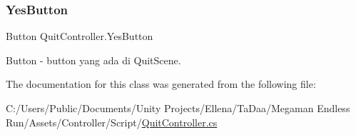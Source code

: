 \subsubsection{\texorpdfstring{Yes\+Button}{YesButton}}
{\footnotesize\ttfamily Button Quit\+Controller.\+Yes\+Button}



Button -\/ button yang ada di Quit\+Scene. 



The documentation for this class was generated from the following file\+:\begin{DoxyCompactItemize}
\item 
C\+:/\+Users/\+Public/\+Documents/\+Unity Projects/\+Ellena/\+Ta\+Daa/\+Megaman Endless Run/\+Assets/\+Controller/\+Script/\hyperlink{_quit_controller_8cs}{Quit\+Controller.\+cs}\end{DoxyCompactItemize}
